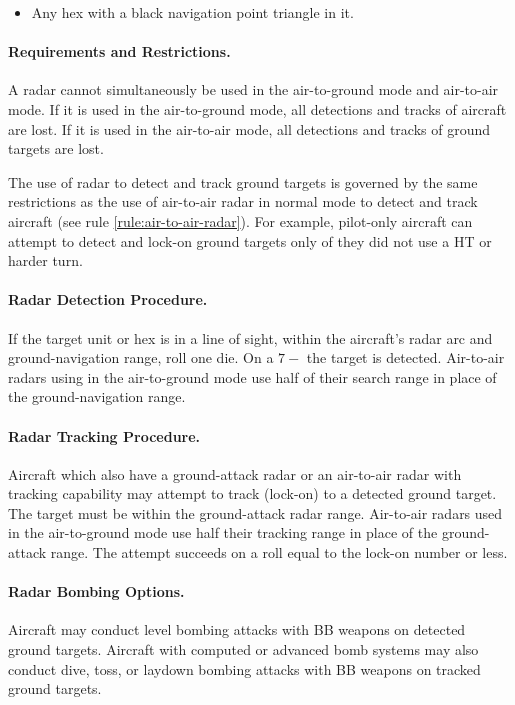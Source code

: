 \begin{advancedrules}
{\begin{itemize}
    \item Any hex with a black navigation point triangle in it.

\end{itemize}

\paragraph{Requirements and Restrictions.} A radar cannot simultaneously be used in the air-to-ground mode and air-to-air mode. If it is used in the air-to-ground mode, all detections and tracks of aircraft are lost. If it is used in the air-to-air mode, all detections and tracks of ground targets are lost. 

The use of radar to detect and track ground targets is governed by the same restrictions as the use of air-to-air radar in normal mode to detect and track aircraft (see rule \ref{rule:air-to-air-radar}). For example, pilot-only aircraft can attempt to detect and lock-on ground targets only of they did not use a HT or harder turn.

\paragraph{Radar Detection Procedure.} If the target unit or hex is in a line of sight, within the aircraft's radar arc and ground-navigation range, roll one die. On a $7-$ the target is detected. Air-to-air radars using in the air-to-ground mode use half of their search range in place of the ground-navigation range.

\paragraph{Radar Tracking Procedure.} Aircraft which also have a ground-attack radar or an air-to-air radar with tracking capability may attempt to track (lock-on) to a detected ground target. The target must be within the ground-attack radar range. Air-to-air radars used in the air-to-ground mode use half their tracking range in place of the ground-attack range. The attempt succeeds on a roll equal to the lock-on number or less.

\paragraph{Radar Bombing Options.} Aircraft may conduct level bombing attacks with BB weapons on detected ground targets. Aircraft with computed or advanced bomb systems may also conduct dive, toss, or laydown bombing attacks with BB weapons on tracked ground targets.

}
\end{advancedrules}
